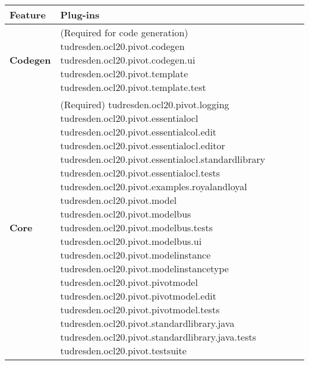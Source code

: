 \begin{table}[h]
\begin{tabular}{|p{4cm}|p{10cm}|}
    \hline
    \textbf{Feature} & \textbf{Plug-ins} \\
    \hline

    \textbf{Codegen} &
    (Required for code generation)\newline
    tudresden.ocl20.pivot.codegen\newline
    tudresden.ocl20.pivot.codegen.ui\newline
    tudresden.ocl20.pivot.template\newline
    tudresden.ocl20.pivot.template.test\\
    \hline

    \textbf{Core} & 
    (Required)\newline
    tudresden.ocl20.pivot.logging\newline
    tudresden.ocl20.pivot.essentialocl\newline
    tudresden.ocl20.pivot.essentialcol.edit\newline
    tudresden.ocl20.pivot.essentialocl.editor\newline
    tudresden.ocl20.pivot.essentialocl.standardlibrary\newline
    tudresden.ocl20.pivot.essentialocl.tests\newline
    tudresden.ocl20.pivot.examples.royalandloyal\newline
    tudresden.ocl20.pivot.model\newline
    tudresden.ocl20.pivot.modelbus\newline
    tudresden.ocl20.pivot.modelbus.tests\newline
    tudresden.ocl20.pivot.modelbus.ui\newline
    tudresden.ocl20.pivot.modelinstance\newline
    tudresden.ocl20.pivot.modelinstancetype\newline
    tudresden.ocl20.pivot.pivotmodel\newline
    tudresden.ocl20.pivot.pivotmodel.edit\newline
    tudresden.ocl20.pivot.pivotmodel.tests\newline
    tudresden.ocl20.pivot.standardlibrary.java\newline
    tudresden.ocl20.pivot.standardlibrary.java.tests\newline
    tudresden.ocl20.pivot.testsuite\\
    \hline


\end{tabular}
\end{table}
